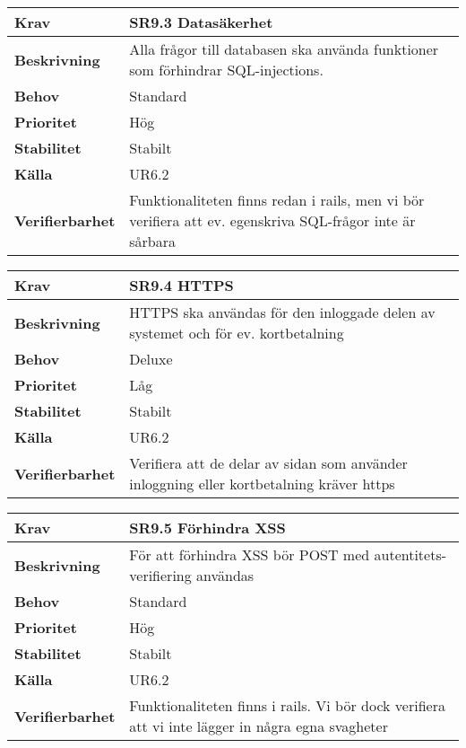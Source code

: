 \documentclass[a4paper, twoside, 11pt, titlepage]{article}
\begin{document}
\begin{tabular} { p{2.6cm} p{12.5cm} }
	\hline
	\sffamily\textbf{Krav} & \sffamily\textbf{SR9.3 Datasäkerhet } \\
	\hline
	\sffamily\textbf{Beskrivning} & Alla frågor till databasen ska använda funktioner som förhindrar SQL-injections.  \\
	\hline
	\sffamily\textbf{Behov} & Standard  \\
	\hline
	\sffamily\textbf{Prioritet} & Hög  \\
	\hline
	\sffamily\textbf{Stabilitet} & Stabilt  \\
	\hline
	\sffamily\textbf{Källa} & UR6.2  \\
	\hline
	\sffamily\textbf{Verifierbarhet} & Funktionaliteten finns redan i rails, men vi bör verifiera att ev. egenskriva SQL-frågor inte är sårbara  \\
	\hline
\end{tabular}
\vspace{6mm}

\begin{tabular} { p{2.6cm} p{12.5cm} }
	\hline
	\sffamily\textbf{Krav} & \sffamily\textbf{SR9.4 HTTPS  } \\
	\hline
	\sffamily\textbf{Beskrivning} & HTTPS ska användas för den inloggade delen av systemet och för ev. kortbetalning  \\
	\hline
	\sffamily\textbf{Behov} & Deluxe  \\
	\hline
	\sffamily\textbf{Prioritet} & Låg  \\
	\hline
	\sffamily\textbf{Stabilitet} & Stabilt  \\
	\hline
	\sffamily\textbf{Källa} & UR6.2  \\
	\hline
	\sffamily\textbf{Verifierbarhet} & Verifiera att de delar av sidan som använder inloggning eller kortbetalning kräver https  \\
	\hline
\end{tabular}
\vspace{6mm}

\begin{tabular} { p{2.6cm} p{12.5cm} }
	\hline
	\sffamily\textbf{Krav} & \sffamily\textbf{SR9.5 Förhindra XSS  } \\
	\hline
	\sffamily\textbf{Beskrivning} & För att förhindra XSS bör POST med autentitets-verifiering användas  \\
	\hline
	\sffamily\textbf{Behov} & Standard  \\
	\hline
	\sffamily\textbf{Prioritet} & Hög  \\
	\hline
	\sffamily\textbf{Stabilitet} & Stabilt  \\
	\hline
	\sffamily\textbf{Källa} & UR6.2  \\
	\hline
	\sffamily\textbf{Verifierbarhet} & Funktionaliteten finns i rails. Vi bör dock verifiera att vi inte lägger in några egna svagheter  \\
	\hline
\end{tabular}
\end{document}

